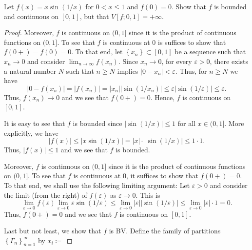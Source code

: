 \begin{problem}
Let $f(x)=x\sin(1/x)$ for $0<x\leq 1$ and $f(0)=0$. Show that $f$ is
bounded and continuous on $[0,1]$, but that $V[f;0,1]=+\infty$.
\end{problem}
\begin{proof}
Moreover, $f$ is continuous on $(0,1]$ since it is the product of
continuous functions on $(0,1]$. To see that $f$ is continuous at $0$ is
suffices to show that $f(0+)=f(0)=0$. To that end, let
$\left\{x_n\right\}\subset[0,1]$ be a sequence such that $x_n\to 0$ and
consider $\lim_{n\to\infty} f\left(x_n\right)$. Since $x_n\to 0$, for every
$\varepsilon>0$, there exists a natural number $N$ such that $n\geq N$
implies $|0-x_n|<\varepsilon$. Thus, for $n\geq N$ we have
\[
\left|0-f(x_n)\right|=\left|f(x_n)\right|=
\left|x_n\right|\left|\sin(1/x_n)\right|\leq
\varepsilon\left|\sin(1/\varepsilon)\right|\leq
\varepsilon.
\]
Thus, $f(x_n)\to 0$ and we see that $f(0+)=0$. Hence, $f$ is continuous on
$[0,1]$.


It is easy to see that $f$ is bounded since $|\sin(1/x)|\leq 1$ for all
$x\in(0,1]$. More explicitly, we have
\[
|f(x)|\leq |x\sin(1/x)|=|x|\cdot|\sin(1/x)|\leq 1\cdot 1.
\]
Thus, $|f(x)|\leq 1$ and we see that $f$ is bounded.

Moreover, $f$ is continuous on $(0,1]$ since it is the product of
continuous functions on $(0,1]$. To see that $f$ is continuous at $0$, it
suffices to show that $f(0+)=0$. To that end, we shall use the following
limiting argument: Let $\varepsilon>0$ and consider the limit (from the
right) of $f(\varepsilon)$ as $\varepsilon\to 0$. This is
\[
\lim_{\varepsilon\to 0}f(\varepsilon)
\lim_{\varepsilon\to 0}\varepsilon\sin(1/\varepsilon)\leq
\lim_{\varepsilon\to 0}\left|\varepsilon\right|\left|\sin(1/\varepsilon)\right|
\leq\lim_{\varepsilon\to 0}\left|\varepsilon\right|\cdot 1=0.
\]
Thus, $f(0+)=0$ and we see that $f$ is continuous on $[0,1]$.

Last but not least, we show that $f$ is BV. Define the family of partitions
$\left\{\Gamma_n\right\}_{n=1}^\infty$ by $x_i\coloneqq$
\end{proof}
\newpage

